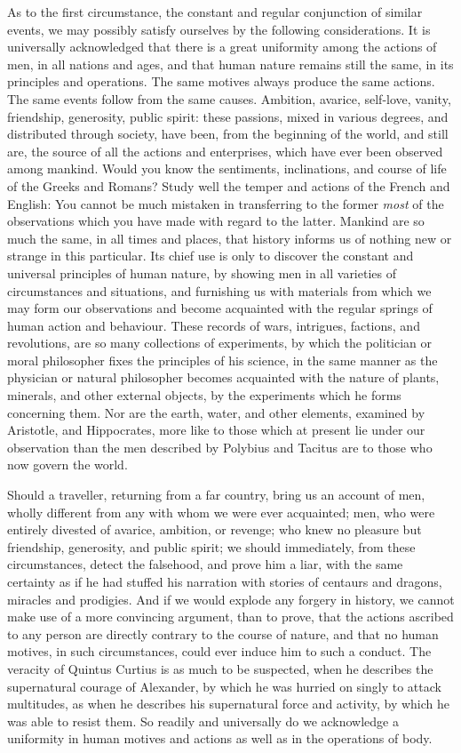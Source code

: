 \documentclass[]{article}
\begin{document}
\begin{sectionbody}
\humeparagraph  As to the first circumstance, the constant and regular conjunction of similar events, we may possibly satisfy ourselves by the following considerations. It is universally acknowledged that there is a great uniformity among the actions of men, in all nations and ages, and that human nature remains still the same, in its principles and operations. The same motives always produce the same actions. The same events follow from the same causes. Ambition, avarice, self-love, vanity, friendship, generosity, public spirit: these passions, mixed in various degrees, and distributed through society, have been, from the beginning of the world, and still are, the source of all the actions and enterprises, which have ever been observed among mankind. Would you know the sentiments, inclinations, and course of life of the Greeks and Romans? Study well the temper and actions of the French and English: You cannot be much mistaken in transferring to the former \emph{most} of the observations which you have made with regard to the latter. Mankind are so much the same, in all times and places, that history informs us of nothing new or strange in this particular. Its chief use is only to discover the constant and universal principles of human nature, by showing men in all varieties of circumstances and situations, and furnishing us with materials from which we may form our observations and become acquainted with the regular springs of human action and behaviour. These records of wars, intrigues, factions, and revolutions, are so many collections of experiments, by which the politician or moral philosopher fixes the principles of his science, in the same manner as the physician or natural philosopher becomes acquainted with the nature of plants, minerals, and other external objects, by the experiments which he forms concerning them. Nor are the earth, water, and other elements, examined by Aristotle, and Hippocrates, more like to those which at present lie under our observation than the men described by Polybius and Tacitus are to those who now govern the world.

\humeparagraph  Should a traveller, returning from a far country, bring us an account of men, wholly different from any with whom we were ever acquainted; men, who were entirely divested of avarice, ambition, or revenge; who knew no pleasure but friendship, generosity, and public spirit; we should immediately, from these circumstances, detect the falsehood, and prove him a liar, with the same certainty as if he had stuffed his narration with stories of centaurs and dragons, miracles and prodigies. And if we would explode any forgery in history, we cannot make use of a more convincing argument, than to prove, that the actions ascribed to any person are directly contrary to the course of nature, and that no human motives, in such circumstances, could ever induce him to such a conduct. The veracity of Quintus Curtius is as much to be suspected, when he describes the supernatural courage of Alexander, by which he was hurried on singly to attack multitudes, as when he describes his supernatural force and activity, by which he was able to resist them. So readily and universally do we acknowledge a uniformity in human motives and actions as well as in the operations of body.


\end{sectionbody}
\end{document}
